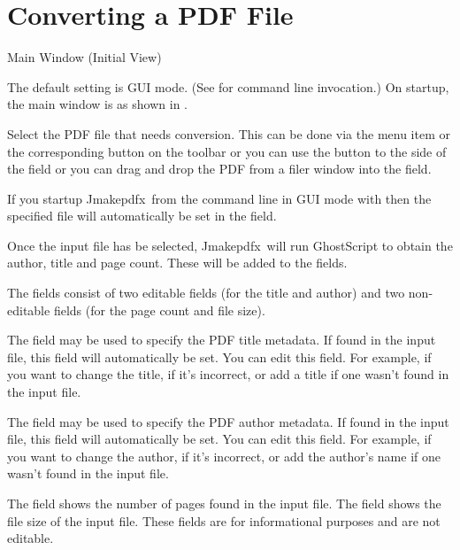 \documentclass[toc=listof]{scrreport}
\newcommand{\Jmakepdfx}{Jmakepdfx}
\begin{document}
\chapter{Converting a PDF File}
\label{sec:conversion}

 {%
 }
 {Main Window (Initial View)}

The default setting is \gls{GUI} mode. (See 
for command line invocation.) On startup, the main window is as
shown in .

Select the PDF file that needs conversion. This can be done via the 
 menu item or the corresponding button on the
toolbar or you can use the  button to the
side of the  field or you can drag and drop the
PDF from a filer window into the  field.

\begin{information}
If you startup \Jmakepdfx\ from the command line in \gls{GUI} mode
with  then the specified file will automatically be
set in the  field.
\end{information}

Once the input file has be selected, \Jmakepdfx\ will run
GhostScript to obtain the author, title and page count.
These will be added to the  fields.

The  fields consist of two editable fields
(for the title and author) and two non-editable fields (for the page
count and file size).

The  field may be used to specify the PDF
title metadata. If found in the input file, this field will
automatically be set. You can edit this field. For example, if you
want to change the title, if it's incorrect, or add a title if one
wasn't found in the input file.

The  field may be used to specify the PDF
author metadata. If found in the input file, this field will
automatically be set. You can edit this field. For example, if you
want to change the author, if it's incorrect, or add the author's
name if one wasn't found in the input file.

The  field shows the number of pages found
in the input file. 
The  field shows the file size of the input file.
These fields are for informational purposes and are not editable.
\end{document}
